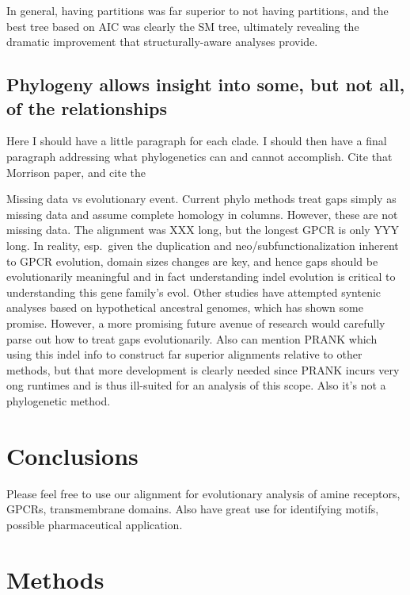 \documentclass[fleqn,10pt]{wlpeerj}
\begin{document}
In general, having partitions was far superior to not having partitions, and the best tree based on AIC was clearly the SM tree, ultimately revealing the dramatic improvement that structurally-aware analyses provide.


\subsection*{Phylogeny allows insight into some, but not all, of the relationships}
Here I should have a little paragraph for each clade. I should then have a final paragraph addressing what phylogenetics can and cannot accomplish. Cite that Morrison paper, and cite the

Missing data vs evolutionary event. Current phylo methods treat gaps simply as missing data and assume complete homology in columns. However, these are not missing data. The alignment was XXX long, but the longest GPCR is only YYY long. In reality, esp.\ given the duplication and neo/subfunctionalization inherent to GPCR evolution, domain sizes changes are key, and hence gaps should be evolutionarily meaningful and in fact understanding indel evolution is critical to understanding this gene family's evol. Other studies have attempted syntenic analyses based on hypothetical ancestral genomes, which has shown some promise. However, a more promising future avenue of research would carefully parse out how to treat gaps evolutionarily. Also can mention PRANK which using this indel info to construct far superior alignments relative to other methods, but that more development is clearly needed since PRANK incurs very ong runtimes and is thus ill-suited for an analysis of this scope. Also it's not a phylogenetic method.

\section*{Conclusions}
Please feel free to use our alignment for evolutionary analysis of amine receptors, GPCRs, transmembrane domains. Also have great use for identifying motifs, possible pharmaceutical application.



\section*{Methods}
\end{document}
